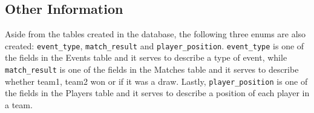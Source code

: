 \subsection{Other Information}

Aside from the tables created in the database, the following three enums are also created:
\texttt{event\_type}, \texttt{match\_result} and \texttt{player\_position}. \texttt{event\_type} is one of the fields
in the Events table and it serves to describe a type of event, while \texttt{match\_result} is one of the fields in the
Matches table and it serves to describe whether team1, team2 won or if it was a draw. Lastly, \texttt{player\_position}
is one of the fields in the Players table and it serves to describe a position of each player in a team.